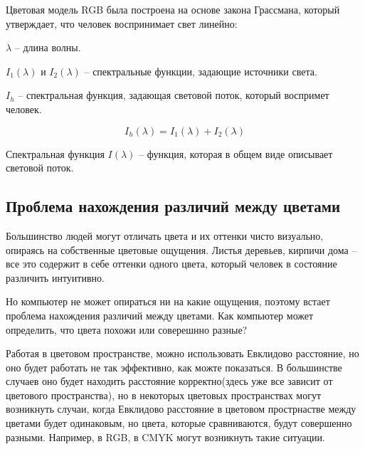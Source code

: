 Цветовая модель RGB была построена на основе закона Грассмана, который утверждает, что человек воспринимает свет линейно:

$\lambda$ -- длина волны. 

$I_1(\lambda)$ и $I_2(\lambda)$ -- спектральные функции, задающие источники света.

$I_h$ -- спектральная функция, задающая световой поток, который воспримет человек.

\begin{equation}
	I_h(\lambda) = I_1(\lambda) + I_2(\lambda)
\end{equation}

Спектральная функция $I(\lambda)$ -- функция, которая в общем виде описывает световой поток.

\subsection{ Проблема нахождения различий между цветами}
Большинство людей могут отличать цвета и их оттенки чисто визуально, опираясь на собственные цветовые ощущения. Листья деревьев, кирпичи дома -- все это содержит в себе оттенки одного цвета, который человек в состояние различить интуитивно.

Но компьютер не может опираться ни на какие ощущения, поэтому встает проблема нахождения различий между цветами. Как компьютер может определить, что цвета похожи или соверешнно разные?

Работая в цветовом пространстве, можно использовать Евклидово расстояние, но оно будет работать не так эффективно, как можте показаться. В большинстве случаев оно будет находить расстояние корректно(здесь уже все зависит от цветового пространства), но в некоторых цветовых пространствах могут возникнуть случаи, когда Евклидово расстояние в цветовом прострнастве между цветами будет одинаковым, но цвета, которые сравниваются, будут совершенно разными. Например, в RGB, в CMYK могут возникнуть такие ситуации.

\begin{figure}[ht!]
\end{figure}

